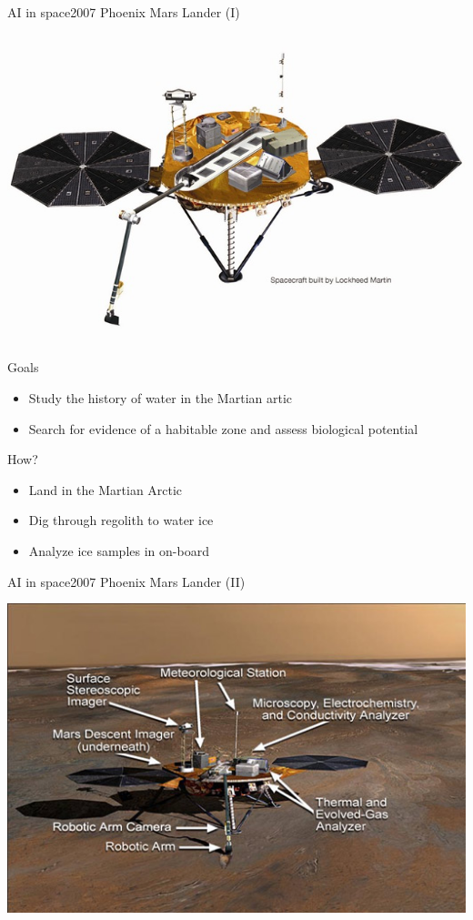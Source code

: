 \documentclass[10pt,compress]{beamer} %
\begin{document}
{\begin{frame}{AI in space}{2007 Phoenix Mars Lander (I)}
\begin{columns}
				\includegraphics[width=\linewidth]{figs/phoenix.jpg}\\
		\end{columns}
		\vspace{-0.2cm}
		Goals
		\begin{itemize}
			\item Study the history of water in the Martian artic
			\item Search for evidence of a habitable zone and assess biological potential
		\end{itemize}
		How?
		\begin{itemize}
			\item Land in the Martian Arctic
			\item Dig through regolith to water ice
			\item Analyze ice samples in on-board
		\end{itemize}
	\end{frame}

	\begin{frame}{AI in space}{2007 Phoenix Mars Lander (II)}
		\vspace{-0.5cm}
		\begin{center}
			\includegraphics[width=0.8\linewidth]{figs/phoenixinstruments.jpg}
		\end{center}
	\end{frame}

}
\end{document}
